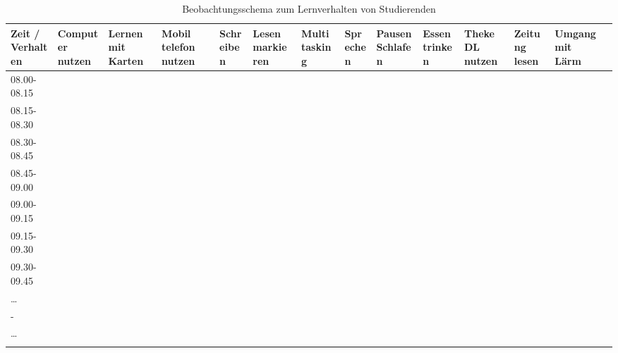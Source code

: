 \begin{tiny}
\begin{longtable}[c]{p{0.7cm}p{0.7cm}p{0.7cm}p{0.7cm}p{0.7cm}p{0.7cm}p{0.7cm}p{0.7cm}p{0.7cm}p{0.7cm}p{0.7cm}p{0.7cm}p{0.7cm}p{0.7cm}}
\toprule
Zeit / Verhalten & Computer nutzen & Lernen mit Karten & Mobil telefon
nutzen & Schreiben & Lesen markieren & Multi tasking & Sprechen & Pausen
Schlafen & Essen trinken & Theke DL nutzen & Zeitung lesen & Umgang mit
Lärm\tabularnewline
\midrule
\endhead
08.00-08.15 & & & & & & & & & & & &\tabularnewline
08.15-08.30 & & & & & & & & & & & &\tabularnewline
08.30-08.45 & & & & & & & & & & & &\tabularnewline
08.45-09.00 & & & & & & & & & & & &\tabularnewline
09.00-09.15 & & & & & & & & & & & &\tabularnewline
09.15-09.30 & & & & & & & & & & & &\tabularnewline
09.30-09.45 & & & & & & & & & & & &\tabularnewline
\ldots{} & & & & & & & & & & & &\tabularnewline
- & & & & & & & & & & & &\tabularnewline
\ldots{} & & & & & & & & & & & &\tabularnewline
\bottomrule
\caption{Beobachtungsschema zum Lernverhalten von Studierenden
}
\label{tab:1}
\end{longtable}
\end{tiny}